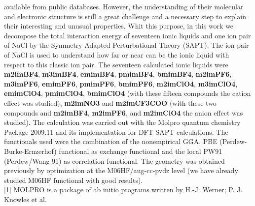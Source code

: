 available from public databases. However, the understanding of their molecular and
electronic structure is still a great challenge and a necessary step to explain their
interesting and unusual properties. Whit this purpose, in this work we decompose the
total interaction energy of seventeen ionic liquids and one ion pair of NaCl by the
Symmetry Adapted Perturbational Theory (SAPT). The ion pair of NaCl is used to
understand how far or near can be the ionic liquid with respect to this classic ion pair.
The seventeen calculated ionic liquids were {\bf m2imBF4}, {\bf m3imBF4}, {\bf emimBF4},
{\bf pmimBF4}, {\bf bmimBF4}, {\bf m2imPF6}, {\bf m3imPF6}, {\bf emimPF6}, {\bf pmimPF6}, {\bf bmimPF6},
{\bf m2imClO4}, {\bf m3imClO4}, {\bf emimClO4}, {\bf pmimClO4}, {\bf bmimClO4} (with these fifteen
compounds the cation effect was studied), {\bf m2imNO3} and {\bf m2imCF3COO} (with these
two compounds and {\bf m2imBF4}, {\bf m2imPF6}, and {\bf m2imClO4} the anion effect was studied).
The calculation was carried out with the Molpro quantum chemistry Package 2009.11
and its implementation for DFT-SAPT calculations. The functionals used were the
combination of the nonempirical GGA, PBE (Perdew-Burke-Ernzerhof) functional as
exchange functional and the local PW91 (Perdew/Wang 91) as correlation functional.
The geometry was obtained previously by optimization at the M06HF/aug-cc-pvdz level
(we have already studied M06HF functional with good results).
\\
\vspace{1.5cm}
{\footnotesize
[1] MOLPRO is a package of ab initio programs written by H.-J. Werner; P. J. Knowles et al.}









